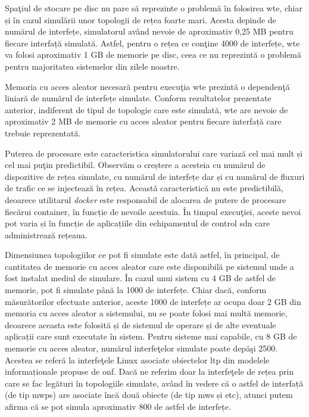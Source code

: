 Spaţiul de stocare pe disc nu pare să reprezinte o problemă în folosirea \gls{wte}, chiar și în cazul simulării unor topologii de rețea foarte mari. Acesta depinde de numărul de interfețe, simulatorul având nevoie de aproximativ 0,25 MB pentru fiecare interfață simulată. Astfel, pentru o rețea ce conţine 4000 de interfețe, \gls{wte} va folosi aproximativ 1 GB de memorie pe disc, ceea ce nu reprezintă o problemă pentru majoritatea sistemelor din zilele noastre.

Memoria cu acces aleator necesară pentru execuţia \gls{wte} prezintă o dependenţă liniară de numărul de interfețe simulate. Conform rezultatelor prezentate anterior, indiferent de tipul de topologie care este simulată, \gls{wte} are nevoie de aproximativ 2 MB de memorie cu acces aleator pentru fiecare interfață care trebuie reprezentată.

Puterea de procesare este caracteristica simulatorului care variază cel mai mult și cel mai puţin predictibil. Observăm o creștere a acesteia cu numărul de dispozitive de rețea simulate, cu numărul de interfețe dar și cu numărul de fluxuri de trafic ce se injectează în rețea. Această caracteristică nu este predictibilă, deoarece utilitarul \textit{docker} este responsabil de alocarea de putere de procesare fiecărui container, în funcție de nevoile acestuia. În timpul execuţiei, aceste nevoi pot varia și în funcție de aplicațiile din echipamentul de control \gls{sdn} care administrează rețeaua.

Dimensiunea topologiilor ce pot fi simulate este dată astfel, în principal, de cantitatea de memorie cu acces aleator care este disponibilă pe sistemul unde a fost instalat mediul de simulare. În cazul unui sistem cu 4 GB de astfel de memorie, pot fi simulate până la 1000 de interfețe. Chiar dacă, conform măsurătorilor efectuate anterior, aceste 1000 de interfețe ar ocupa doar 2 GB din memoria cu acces aleator a sistemului, nu se poate folosi mai multă memorie, deoarece aceasta este folosită și de sistemul de operare și de alte eventuale aplicații care sunt executate în sistem. Pentru sisteme mai capabile, cu 8 GB de memorie cu acces aleator, numărul interfeţelor simulate poate depăşi 2500. Acestea se referă la interfeţele Linux asociate obiectelor \gls{ltp} din modelele informaționale propuse de \gls{onf}. Dacă ne referim doar la interfeţele de rețea prin care se fac legături în topologiile simulate, având în vedere că o astfel de interfață (de tip \gls{mwps}) are asociate încă două obiecte (de tip \gls{mws} și \gls{etc}), atunci putem afirma că se pot simula aproximativ 800 de astfel de interfețe.